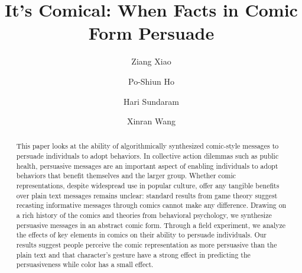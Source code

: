 \documentclass[format=acmsmall, natbib=false, review=false, anonymous=true, screen=true]{acmart}
\begin{document}
\title[Persuasion in Comic form]{It's Comical: When Facts in Comic Form Persuade}


\author{Ziang Xiao}
\author{Po-Shiun Ho}
\author{Hari Sundaram}
\author{Xinran Wang}




\begin{abstract}
This paper looks at the ability of algorithmically synthesized comic-style messages to persuade individuals to adopt behaviors. In collective action dilemmas such as public health, persuasive messages are an important aspect of enabling individuals to adopt behaviors that benefit themselves and the larger group. Whether comic representations, despite widespread use in popular culture, offer any tangible benefits over plain text messages remains unclear: standard results from game theory suggest recasting informative messages through comics cannot make any difference. Drawing on a rich history of the comics and theories from behavioral psychology, we synthesize persuasive messages in an abstract comic form. Through a field experiment, we analyze the effects of key elements in comics on their ability to persuade individuals. Our results suggest people perceive the comic representation as more persuasive than the plain text and that character's gesture have a strong effect in predicting the persuasiveness while color has a small effect.
\end{abstract}


%
%
%
\end{document}
